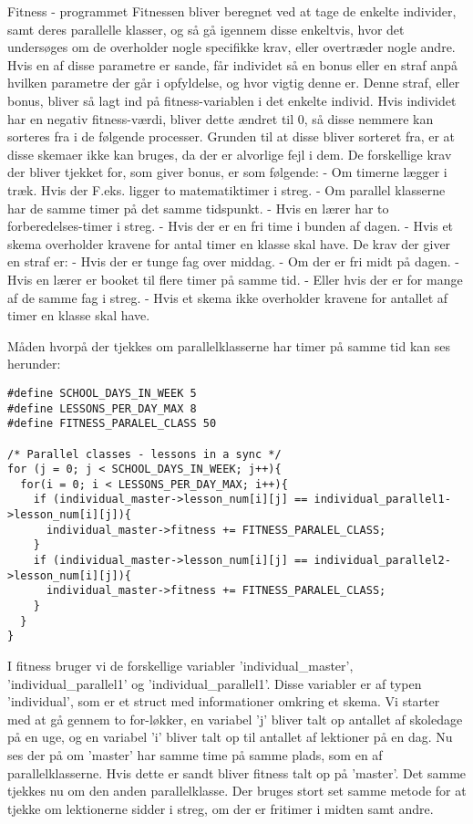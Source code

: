 Fitness - programmet
Fitnessen bliver beregnet ved at tage de enkelte individer, samt deres parallelle klasser, og så gå igennem disse enkeltvis, hvor det undersøges om de overholder nogle specifikke krav, eller overtræder nogle andre. Hvis en af disse parametre er sande, får individet så en bonus eller en straf anpå hvilken parametre der går i opfyldelse, og hvor vigtig denne er. Denne straf, eller bonus, bliver så lagt ind på fitness-variablen i det enkelte individ. Hvis individet har en negativ fitness-værdi, bliver dette ændret til 0, så disse nemmere kan sorteres fra i de følgende processer. Grunden til at disse bliver sorteret fra, er at disse skemaer ikke kan bruges, da der er alvorlige fejl i dem.
De forskellige krav der bliver tjekket for, som giver bonus, er som følgende:
   -	Om timerne lægger i træk. Hvis der F.eks. ligger to matematiktimer i streg.
   -	Om parallel klasserne har de samme timer på det samme tidspunkt. 
   -	Hvis en lærer har to forberedelses-timer i streg.
   -	Hvis der er en fri time i bunden af dagen.
   -	Hvis et skema overholder kravene for antal timer en klasse skal have.
De krav der giver en straf er:
   -	Hvis der er tunge fag over middag.
   -	Om der er fri midt på dagen.
   -	Hvis en lærer er booket til flere timer på samme tid.
   -	Eller hvis der er for mange af de samme fag i streg.
   -	Hvis et skema ikke overholder kravene for antallet af timer en klasse skal have.

Måden hvorpå der tjekkes om parallelklasserne har timer på samme tid kan ses herunder:

\begin{lstlisting}
#define SCHOOL_DAYS_IN_WEEK 5
#define LESSONS_PER_DAY_MAX 8
#define FITNESS_PARALEL_CLASS 50

/* Parallel classes - lessons in a sync */
for (j = 0; j < SCHOOL_DAYS_IN_WEEK; j++){
  for(i = 0; i < LESSONS_PER_DAY_MAX; i++){
    if (individual_master->lesson_num[i][j] == individual_parallel1->lesson_num[i][j]){
      individual_master->fitness += FITNESS_PARALEL_CLASS;
    }
    if (individual_master->lesson_num[i][j] == individual_parallel2->lesson_num[i][j]){
      individual_master->fitness += FITNESS_PARALEL_CLASS;
    }
  }
}
\end{lstlisting}

I fitness bruger vi de forskellige variabler ’individual_master’, ’individual_parallel1’ og ’individual_parallel1’. Disse variabler er af typen ’individual’, som er et struct med informationer omkring et skema.
Vi starter med at gå gennem to for-løkker, en variabel ’j’ bliver talt op antallet af skoledage på en uge, og en variabel ’i’ bliver talt op til antallet af lektioner på en dag. Nu ses der på om ’master’ har samme time på samme plads, som en af parallelklasserne. Hvis dette er sandt bliver fitness talt op på ’master’. Det samme tjekkes nu om den anden parallelklasse. 
Der bruges stort set samme metode for at tjekke om lektionerne sidder i streg, om der er fritimer i midten samt andre.
